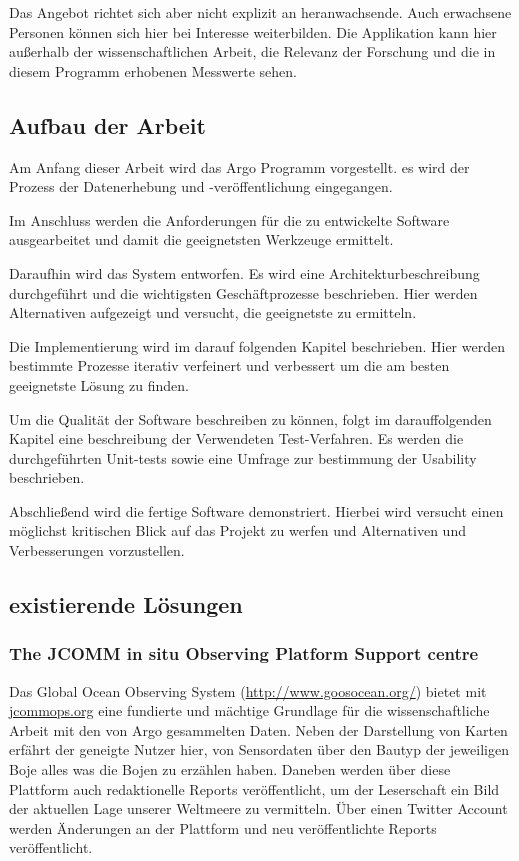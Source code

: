     Das Angebot richtet sich aber nicht explizit an heranwachsende. Auch erwachsene Personen können sich hier bei Interesse weiterbilden. Die Applikation kann hier außerhalb der wissenschaftlichen Arbeit,  die Relevanz der Forschung und die in diesem Programm erhobenen Messwerte sehen. 
    
    
    \subsection{Aufbau der Arbeit}
    
    Am Anfang dieser Arbeit wird das Argo Programm vorgestellt. es wird der Prozess der Datenerhebung und -veröffentlichung eingegangen. 
    
    Im Anschluss werden die Anforderungen für die zu entwickelte Software ausgearbeitet und damit die geeignetsten Werkzeuge ermittelt.
    
    Daraufhin wird das System entworfen. Es wird eine Architekturbeschreibung durchgeführt und die wichtigsten Geschäftprozesse beschrieben. Hier werden Alternativen aufgezeigt und versucht, die geeignetste zu ermitteln.
    
    Die Implementierung wird im darauf folgenden Kapitel beschrieben. Hier werden bestimmte Prozesse iterativ verfeinert und verbessert um die am besten geeignetste Lösung zu finden. 
    
    Um die Qualität der Software beschreiben zu können, folgt im darauffolgenden Kapitel eine beschreibung der Verwendeten Test-Verfahren. Es werden die durchgeführten Unit-tests sowie eine Umfrage zur bestimmung der Usability beschrieben.
    
    
    Abschließend wird die fertige Software demonstriert. Hierbei wird versucht einen möglichst kritischen Blick auf das Projekt zu werfen und Alternativen und Verbesserungen vorzustellen.
    
    
    
    \subsection{existierende Lösungen}
    
    
    \subsubsection{The JCOMM in situ Observing Platform Support centre} 
    
    Das Global Ocean Observing System (\url{http://www.goosocean.org/}) bietet mit \url{jcommops.org} eine fundierte und mächtige Grundlage für die wissenschaftliche Arbeit mit den von Argo gesammelten Daten. Neben der Darstellung von Karten erfährt der geneigte Nutzer hier, von Sensordaten über den Bautyp der jeweiligen Boje alles was die Bojen zu erzählen haben. Daneben werden über diese Plattform auch redaktionelle Reports veröffentlicht, um der Leserschaft ein Bild der aktuellen Lage unserer Weltmeere zu vermitteln. Über einen Twitter Account werden Änderungen an der Plattform und neu veröffentlichte Reports veröffentlicht. 
    
